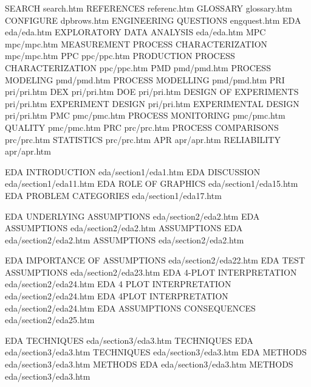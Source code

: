 SEARCH                                  search.htm
REFERENCES                              referenc.htm
GLOSSARY                                glossary.htm
CONFIGURE                               dpbrows.htm
ENGINEERING QUESTIONS                   engquest.htm
EDA                                     eda/eda.htm
EXPLORATORY DATA ANALYSIS               eda/eda.htm
MPC                                     mpc/mpc.htm
MEASUREMENT PROCESS CHARACTERIZATION    mpc/mpc.htm
PPC                                     ppc/ppc.htm
PRODUCTION PROCESS CHARACTERIZATION     ppc/ppc.htm
PMD                                     pmd/pmd.htm
PROCESS MODELING                        pmd/pmd.htm
PROCESS MODELLING                       pmd/pmd.htm
PRI                                     pri/pri.htm
DEX                                     pri/pri.htm
DOE                                     pri/pri.htm
DESIGN OF EXPERIMENTS                   pri/pri.htm
EXPERIMENT DESIGN                       pri/pri.htm
EXPERIMENTAL DESIGN                     pri/pri.htm
PMC                                     pmc/pmc.htm
PROCESS MONITORING                      pmc/pmc.htm
QUALITY                                 pmc/pmc.htm
PRC                                     prc/prc.htm
PROCESS COMPARISONS                     prc/prc.htm
STATISTICS                              prc/prc.htm
APR                                     apr/apr.htm
RELIABILITY                             apr/apr.htm

EDA INTRODUCTION                        eda/section1/eda1.htm
EDA DISCUSSION                          eda/section1/eda11.htm
EDA ROLE OF GRAPHICS                    eda/section1/eda15.htm
EDA PROBLEM CATEGORIES                  eda/section1/eda17.htm

EDA UNDERLYING ASSUMPTIONS              eda/section2/eda2.htm
EDA ASSUMPTIONS                         eda/section2/eda2.htm
ASSUMPTIONS EDA                         eda/section2/eda2.htm
ASSUMPTIONS                             eda/section2/eda2.htm


EDA IMPORTANCE OF ASSUMPTIONS           eda/section2/eda22.htm
EDA TEST ASSUMPTIONS                    eda/section2/eda23.htm
EDA 4-PLOT INTERPRETATION               eda/section2/eda24.htm
EDA 4 PLOT INTERPRETATION               eda/section2/eda24.htm
EDA 4PLOT INTERPRETATION                eda/section2/eda24.htm
EDA ASSUMPTIONS CONSEQUENCES            eda/section2/eda25.htm

EDA TECHNIQUES                          eda/section3/eda3.htm
TECHNIQUES EDA                          eda/section3/eda3.htm
TECHNIQUES                              eda/section3/eda3.htm
EDA METHODS                             eda/section3/eda3.htm
METHODS EDA                             eda/section3/eda3.htm
METHODS                                 eda/section3/eda3.htm

